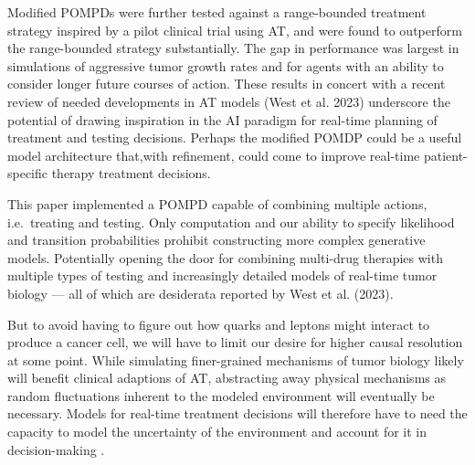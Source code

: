 \documentclass[
]{article}
\begin{document}
Modified POMPDs were further tested against a range-bounded treatment
strategy inspired by a pilot clinical trial using AT, and were found to
outperform the range-bounded strategy substantially. The gap in
performance was largest in simulations of aggressive tumor growth rates
and for agents with an ability to consider longer future courses of
action. These results in concert with a recent review of needed
developments in AT models (West et al. 2023) underscore the potential of
drawing inspiration in the AI paradigm for real-time planning of
treatment and testing decisions. Perhaps the modified POMDP could be a
useful model architecture that,with refinement, could come to improve
real-time patient-specific therapy treatment decisions.

This paper implemented a POMPD capable of combining multiple actions,
i.e.~treating and testing. Only computation and our ability to specify
likelihood and transition probabilities prohibit constructing more
complex generative models. Potentially opening the door for combining
multi-drug therapies with multiple types of testing and increasingly
detailed models of real-time tumor biology --- all of which are
desiderata reported by West et al. (2023).

But to avoid having to figure out how quarks and leptons might interact
to produce a cancer cell, we will have to limit our desire for higher
causal resolution at some point. While simulating finer-grained
mechanisms of tumor biology likely will benefit clinical adaptions of
AT, abstracting away physical mechanisms as random fluctuations inherent
to the modeled environment will eventually be necessary. Models for
real-time treatment decisions will therefore have to need the capacity
to model the uncertainty of the environment and account for it in
decision-making .
\end{document}
